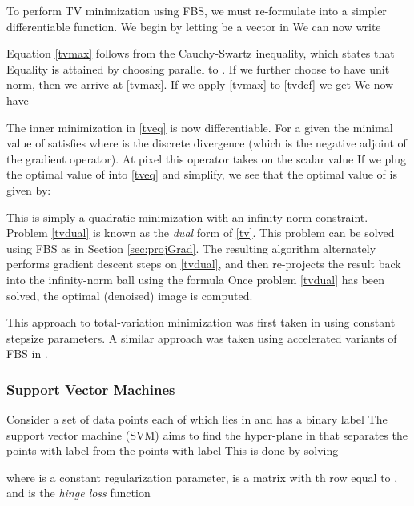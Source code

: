 \documentclass{amsart}
\newcommand{\half}{\frac{1}{2}}
\newcommand{\eqn}[2]{}
\newcommand{\aln}[1]{}
\newcommand{\ra}{\rangle}
\newcommand{\la}{\langle}
\DeclareMathOperator*{\minimize}{minimize\quad}
\DeclareMathOperator*{\argmax}{arg\,max}
\DeclareMathOperator*{\argmin}{arg\,min}
\theoremstyle{definition}
\begin{document}
   To perform TV minimization using FBS, we must re-formulate  into a simpler differentiable function.   We begin by letting  be a vector in   We can now write
    \eqn{tvmax}{
    \max_{\|x_{ij}\|\le1}  \la x_{ij}, (\nabla u)_{ij}\ra  =  \|  (\nabla u)_{ij}\|.
    }
    Equation \eqref{tvmax} follows from the Cauchy-Swartz inequality, which states that    Equality is attained by choosing  parallel to .  If we further choose  to have unit norm, then we arrive at \eqref{tvmax}.  If we apply \eqref{tvmax} to \eqref{tvdef}  we get  We now have
    \aln{
\min_u \mu |\nabla u| +\half \|u-f\|^2  &=    \min_u \max_{\|x\|_\infty \le1} \mu \la x, \nabla u\ra+ \half\|u-f\|^2 \nonumber \\
&=  \max_{\|x\|_\infty\le1} \min_u \mu\la x, \nabla u\ra+ \half \|u-f\|^2.  \label{tveq}
}
The inner minimization in \eqref{tveq} is now differentiable.  For a given  the minimal value of  satisfies  where  is the discrete divergence (which is the negative adjoint of the gradient operator).  At pixel  this operator takes on the scalar value   If we plug the optimal value of  into \eqref{tveq} and simplify, we see that the optimal value of  is given by:    
    \eqn{tvdual}{ 
    x^* = \argmax_{\|x\|_\infty\le1} -  \half \| \nabla \cdot x+\frac{1}{\mu}f\|^2= \argmin_{\|x\|_\infty\le1}  \half \| \nabla \cdot x+\frac{1}{\mu}f\|^2.
    }
This is simply a quadratic minimization with an infinity-norm constraint.  Problem \eqref{tvdual} is known as the {\em dual} form of \eqref{tv}.  This problem can be solved using FBS as in Section \eqref{sec:projGrad}.  The resulting algorithm alternately performs gradient descent steps on \eqref{tvdual}, and then re-projects the result back into the infinity-norm ball using the formula   Once problem \eqref{tvdual} has been solved, the optimal (denoised) image  is computed.  

This approach to total-variation minimization was first taken in \cite{Chambolle04} using constant stepsize parameters.  A similar approach was taken using accelerated variants of FBS in \cite{BT09:tv}.

\subsubsection{Support Vector Machines}  \label{sec:svm}
Consider a set of data points  each of which lies in  and has a binary label   The support vector machine (SVM) aims to find the hyper-plane in  that separates the points with label  from the points with label   This is done by solving 
  \eqn{svm}{
   \minimize_{w} \half\|w\|^2 + C\cdot h_l(Dw)
   }  
where   is a constant regularization parameter,  is a matrix with th row equal to , and  is the {\em hinge loss} function 
 
\end{document}
